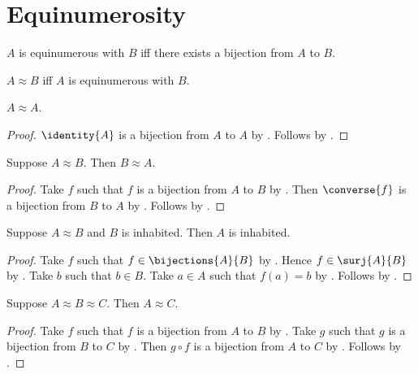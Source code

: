 



\section{Equinumerosity}


\begin{definition}\label{equinum}
    $A$ is equinumerous with $B$ iff there exists a bijection from $A$ to $B$.
\end{definition}

\begin{abbreviation}\label{approx}
    $A\approx B$ iff $A$ is equinumerous with $B$.
\end{abbreviation}

\begin{proposition}\label{equinum_refl}
    $A\approx A$.
\end{proposition}
\begin{proof}
    $\identity{A}$ is a bijection from $A$ to $A$ by .
    Follows by .
\end{proof}

\begin{proposition}\label{equinum_sym}
    Suppose $A\approx B$. Then $B\approx A$.
\end{proposition}
\begin{proof}
    Take $f$ such that $f$ is a bijection from $A$ to $B$ by .
    Then $\converse{f}$ is a bijection from $B$ to $A$ by .
    Follows by .
\end{proof}

\begin{proposition}\label{equinum_inhabited}
    Suppose $A\approx B$ and $B$ is inhabited.
    Then $A$ is inhabited.
\end{proposition}
\begin{proof}
    Take $f$ such that $f\in\bijections{A}{B}$ by .
    Hence $f\in\surj{A}{B}$ by .
    Take $b$ such that $b\in B$.
    Take $a\in A$ such that $f(a)=b$ by .
    Follows by \auto.
\end{proof}

\begin{proposition}\label{equinum_tran}
    Suppose $A\approx B\approx C$. Then $A\approx C$.
\end{proposition}
\begin{proof}
    Take $f$ such that $f$ is a bijection from $A$ to $B$ by .
    Take $g$ such that $g$ is a bijection from $B$ to $C$ by .
    Then $g\circ f$ is a bijection from $A$ to $C$ by .
    Follows by .
\end{proof}




